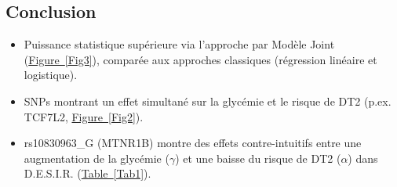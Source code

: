 \documentclass[10pt,a0,portrait]{a0poster}
\newcommand\bref[2]{\hyperref[#1]{#2~\ref*{#1}}}
\begin{document}
\begin{multicols}{2}
\section*{Conclusion}
\vspace{-1cm}
\begin{itemize}
\item Puissance statistique supérieure via l'approche par Modèle Joint (\mbox{\bref{Fig3}{Figure}}), comparée aux approches classiques (régression linéaire et logistique).
\vspace{0.5cm}
\item SNPs montrant un effet simultané sur la glycémie et le risque de DT2 (p.ex. \textcolor{maroon2}{TCF7L2}, \mbox{\bref{Fig2}{Figure}}).
\vspace{0.5cm}
\item rs10830963\_G (\textcolor{maroon2}{MTNR1B}) montre des effets contre-intuitifs entre une augmentation de la glycémie (\textcolor{springgreen3}{$\gamma$}) et une baisse du risque de DT2 (\textcolor{springgreen3}{$\alpha$}) dans D.E.S.I.R. (\mbox{\bref{Tab1}{Table}}).
\end{itemize}


\end{multicols}
\color{SaddleBrown}
\small
\end{document}
